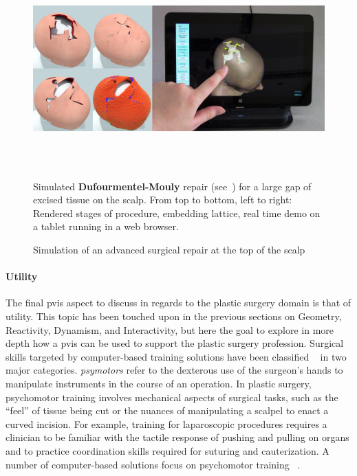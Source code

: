 \begin{figure}
  \includegraphics[height=2.99in]{chapter_gridiron/images/TitleImage.png}
  \vspace*{-.05in}
  \caption{Simulation of an advanced surgical repair at the top of the
    scalp}{Simulated \textbf{Dufourmentel-Mouly} repair (see\
    \protect\cite{Baker:2014}) for a large gap of excised tissue on
    the scalp. From top to bottom, left to right: Rendered stages of
    procedure, embedding lattice, real time demo on a tablet running
    in a web browser.}
  \vspace*{-.05in}
  \label{fig:gridiron-teaser}
\end{figure}

\paragraph{Utility} The final \gls{pvis} aspect to discuss in regards
to the plastic surgery domain is that of utility. This topic has been
touched upon in the previous sections on Geometry, Reactivity,
Dynamism, and Interactivity, but here the goal to explore in more
depth how a \gls{pvis} can be used to support the plastic surgery
profession. Surgical skills targeted by computer-based training
solutions have been classified ~\citep{GallaRCHFMSS:2005} in two major
categories. \emph{\Glspl{psymotor}} refer to the dexterous use of
the surgeon's hands to manipulate instruments in the course of an
operation. In plastic surgery, psychomotor training involves
mechanical aspects of surgical tasks, such as the ``feel''
of tissue being cut or the nuances of manipulating a scalpel to enact
a curved incision. For example, training for laparoscopic procedures
requires a clinician to be familiar with the tactile response of
pushing and pulling on organs and to practice coordination
skills required for suturing and cauterization.  A number of
computer-based solutions focus on psychomotor training
~\citep{MendoL:2003,DeKLS:2005,KimCDS:2007,LindbT:2007}.

